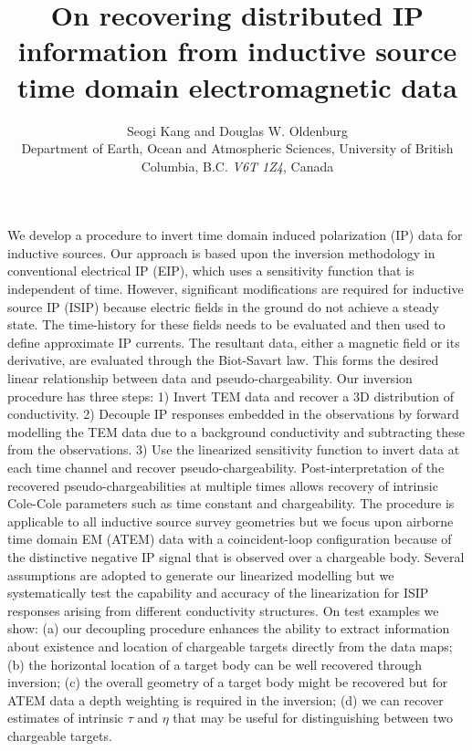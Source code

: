 \documentclass[extra,mreferee]{gji}
\author[Seogi Kang and Douglas W. Oldenburg]
   {Seogi Kang and Douglas W. Oldenburg \\
    Department of Earth, Ocean and Atmospheric Sciences,
    University of British Columbia,
    B.C. \emph{V6T 1Z4}, Canada
  }
\title{On recovering distributed IP information from inductive source time domain electromagnetic data}
\begin{document}
\label{firstpage}

\maketitle





\begin{summary}
We develop a procedure to invert time domain induced polarization (IP) data for inductive sources. Our approach is based upon the inversion methodology in conventional electrical IP (EIP), which uses a sensitivity function that is independent of time. However, significant modifications are required for inductive source IP (ISIP) because electric fields in the ground do not achieve a steady state. The time-history for these fields needs to be evaluated and then used to define approximate IP currents. The resultant data, either a magnetic field or its derivative, are evaluated through the Biot-Savart law. This forms the desired linear relationship between data and pseudo-chargeability.
Our inversion procedure has three steps:
1) Invert TEM data and recover a 3D distribution of conductivity.
2) Decouple IP responses embedded in the observations by forward modelling the TEM data due to a background conductivity and subtracting these from the observations. 3) Use the linearized sensitivity function to invert data at each time channel and recover pseudo-chargeability. Post-interpretation of the recovered pseudo-chargeabilities at multiple times allows recovery of intrinsic Cole-Cole parameters such as time constant and chargeability. The procedure is applicable to all inductive source survey geometries but we focus upon airborne time domain EM (ATEM) data with a coincident-loop configuration because of the distinctive negative IP signal that is observed over a chargeable body.
Several assumptions are adopted to generate our linearized modelling but we systematically test the capability and accuracy of the linearization for ISIP responses arising from different conductivity structures. On test examples we show: (a) our decoupling procedure enhances the ability to extract information about existence and location of chargeable targets directly from the data maps; (b) the horizontal location of a target body can be well recovered through inversion; (c) the overall geometry of a target body might be recovered but for ATEM data a depth weighting is required in the inversion; (d)  we can recover estimates of intrinsic $\tau$ and $\eta$ that may be useful for distinguishing between two chargeable targets.
\end{summary}
\end{document}
